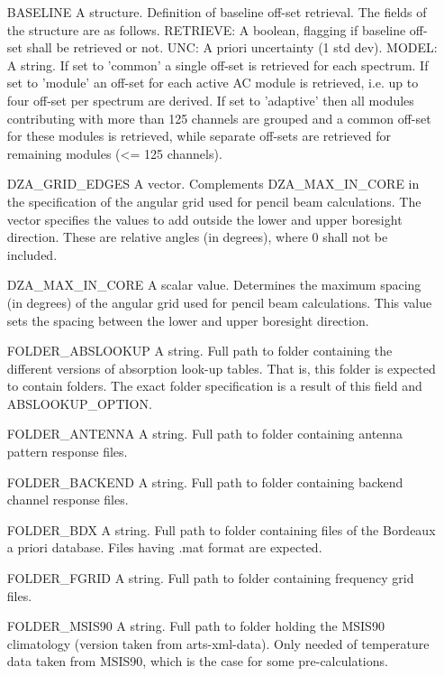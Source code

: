 \begin{changemargin}{2.5cm}{0.0cm}
\begin{itemize}
\item[{BASELINE}]
A structure. Definition of baseline off-set retrieval. The fields of the
structure are as follows. RETRIEVE: A boolean, flagging if baseline off-set
shall be retrieved or not. UNC: A priori uncertainty (1 std dev). MODEL:
A string. If set to 'common' a single off-set is retrieved for each
spectrum. If set to 'module' an off-set for each active AC module is
retrieved, i.e. up to four off-set per spectrum are derived. If set to
'adaptive' then all modules contributing with more than 125 channels are
grouped and a common off-set for these modules is retrieved, while separate
off-sets are retrieved for remaining modules (<= 125 channels).

\item[{DZA\_GRID\_EDGES}]
A vector. Complements DZA\_MAX\_IN\_CORE in the specification of the angular
grid used for pencil beam calculations. The vector specifies the values to
add outside the lower and upper boresight direction. These are relative angles
(in degrees), where 0 shall not be included.

\item[{DZA\_MAX\_IN\_CORE}]
A scalar value. Determines the maximum spacing (in degrees) of the angular
grid used for pencil beam calculations. This value sets the spacing between
the lower and upper boresight direction.

\item[{FOLDER\_ABSLOOKUP}] 
A string. Full path to folder containing the different versions of absorption
look-up tables. That is, this folder is expected to contain folders. The
exact folder specification is a result of this field and ABSLOOKUP\_OPTION.

\item[{FOLDER\_ANTENNA}] 
A string. Full path to folder containing antenna pattern response files.

\item[{FOLDER\_BACKEND}] 
A string. Full path to folder containing backend channel response files.

\item[{FOLDER\_BDX}] 
A string. Full path to folder containing files of the Bordeaux a priori
database. Files having .mat format are expected.

\item[{FOLDER\_FGRID}] 
A string. Full path to folder containing frequency grid files.

\item[{FOLDER\_MSIS90}] 
A string. Full path to folder holding the MSIS90 climatology (version taken
from arts-xml-data). Only needed of temperature data taken from MSIS90,
which is the case for some pre-calculations.


\end{itemize}
\end{changemargin}
